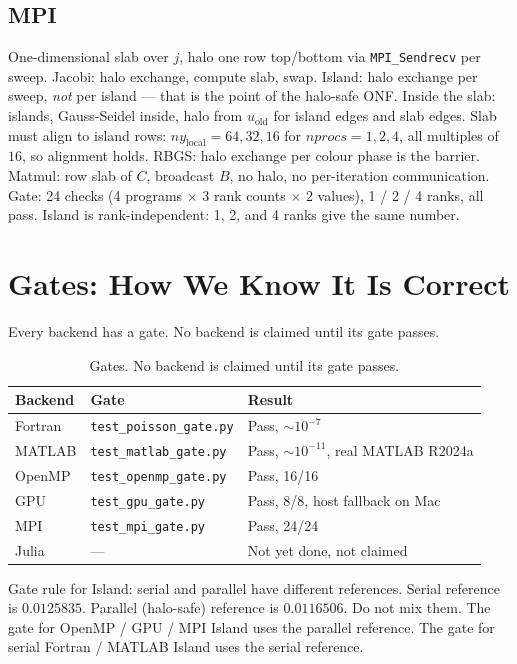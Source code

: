 \documentclass[11pt]{article}
\begin{document}
\subsection{MPI}
One-dimensional slab over $j$, halo one row top/bottom via
\texttt{MPI\_Sendrecv} per sweep. Jacobi: halo exchange, compute slab, swap.
Island: halo exchange per sweep, \emph{not} per island --- that is the point
of the halo-safe ONF. Inside the slab: islands, Gauss-Seidel inside, halo
from $u_{\mathrm{old}}$ for island edges and slab edges. Slab must align to
island rows: $ny_{\mathrm{local}} = 64, 32, 16$ for $nprocs = 1,2,4$, all
multiples of $16$, so alignment holds. RBGS: halo exchange per colour phase
is the barrier. Matmul: row slab of $C$, broadcast $B$, no halo, no
per-iteration communication. Gate: 24 checks (4 programs $\times$ 3 rank
counts $\times$ 2 values), 1 / 2 / 4 ranks, all pass. Island is
rank-independent: 1, 2, and 4 ranks give the same number.

\section{Gates: How We Know It Is Correct}
Every backend has a gate. No backend is claimed until its gate passes.
\begin{table}[h]
\centering
\small
\begin{tabular}{lll}
\toprule
Backend & Gate & Result \\
\midrule
Fortran & \texttt{test\_poisson\_gate.py} & Pass, $\sim 10^{-7}$ \\
MATLAB & \texttt{test\_matlab\_gate.py} & Pass, $\sim 10^{-11}$, real MATLAB R2024a \\
OpenMP & \texttt{test\_openmp\_gate.py} & Pass, 16/16 \\
GPU & \texttt{test\_gpu\_gate.py} & Pass, 8/8, host fallback on Mac \\
MPI & \texttt{test\_mpi\_gate.py} & Pass, 24/24 \\
Julia & --- & Not yet done, not claimed \\
\bottomrule
\end{tabular}
\caption{Gates. No backend is claimed until its gate passes.}
\label{tab:gates}
\end{table}
Gate rule for Island: serial and parallel have different references. Serial
reference is $0.0125835$. Parallel (halo-safe) reference is $0.0116506$.
Do not mix them. The gate for OpenMP / GPU / MPI Island uses the parallel
reference. The gate for serial Fortran / MATLAB Island uses the serial
reference.
\end{document}
